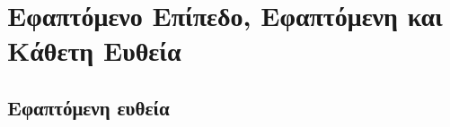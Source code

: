 




\usepackage{wrapfig}

\pagestyle{vangelis}
\everymath{\displaystyle}
\setcounter{chapter}{1}





\chapter*{Εφαπτόμενο Επίπεδο, Εφαπτόμενη και Κάθετη Ευθεία}

\section*{Εφαπτόμενη ευθεία}


